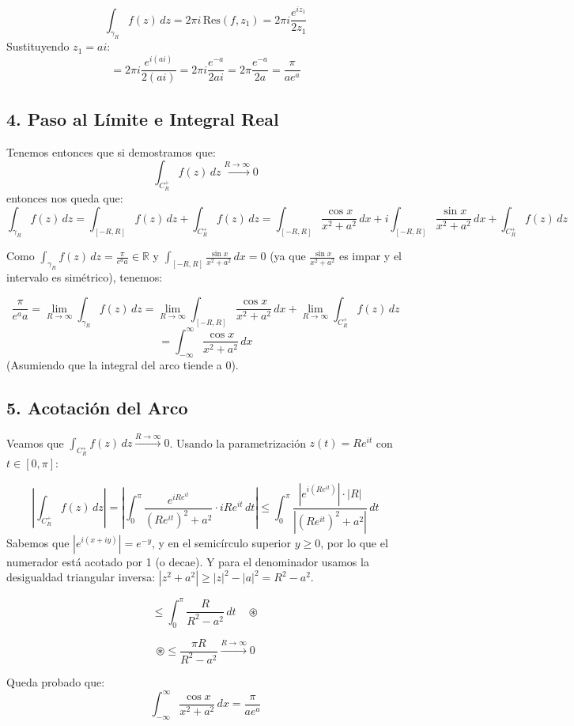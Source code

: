 {\[
\int_{\gamma_R} f(z) \, dz = 2\pi i \, \text{Res}(f, z_1) = 2\pi i \frac{e^{iz_1}}{2z_1}
\]
Sustituyendo $z_1 = ai$:
\[
= 2\pi i \frac{e^{i(ai)}}{2(ai)} = 2\pi i \frac{e^{-a}}{2ai} = 2\pi \frac{e^{-a}}{2a} = \frac{\pi}{a e^a}
\]

\subsection*{4. Paso al Límite e Integral Real}

Tenemos entonces que si demostramos que:
\[
\int_{C_R^+} f(z) \, dz \xrightarrow{R \to \infty} 0
\]
entonces nos queda que:
\[
\int_{\gamma_R} f(z) \, dz = \int_{[-R,R]} f(z) \, dz + \int_{C_R^+} f(z) \, dz = \int_{[-R,R]} \frac{\cos x}{x^2+a^2} \, dx + i \int_{[-R,R]} \frac{\sin x}{x^2+a^2} \, dx + \int_{C_R^+} f(z) \, dz
\]

Como $\int_{\gamma_R} f(z) \, dz = \frac{\pi}{e^a a} \in \mathbb{R}$ y $\int_{[-R,R]} \frac{\sin x}{x^2+a^2} \, dx = 0$ (ya que $\frac{\sin x}{x^2+a^2}$ es impar y el intervalo es simétrico), tenemos:

\[
\frac{\pi}{e^a a} = \lim_{R \to \infty} \int_{\gamma_R} f(z) \, dz = \lim_{R \to \infty} \int_{[-R,R]} \frac{\cos x}{x^2+a^2} \, dx + \lim_{R \to \infty} \int_{C_R^+} f(z) \, dz
\]
\[
= \int_{-\infty}^{\infty} \frac{\cos x}{x^2+a^2} \, dx
\]
(Asumiendo que la integral del arco tiende a 0).

\subsection*{5. Acotación del Arco }

Veamos que $\int_{C_R^+} f(z) \, dz \xrightarrow{R \to \infty} 0$.
Usando la parametrización $z(t) = R e^{it}$ con $t \in [0, \pi]$:

\[
\left| \int_{C_R^+} f(z) \, dz \right| = \left| \int_{0}^{\pi} \frac{e^{i R e^{it}}}{(R e^{it})^2 + a^2} \cdot i R e^{it} \, dt \right| \le \int_{0}^{\pi} \frac{|e^{i(R e^{it})}| \cdot |R|}{|(R e^{it})^2 + a^2|} \, dt
\]
Sabemos que $|e^{i(x+iy)}| = e^{-y}$, y en el semicírculo superior $y \ge 0$, por lo que el numerador está acotado por 1 (o decae). Y para el denominador usamos la desigualdad triangular inversa: $|z^2+a^2| \ge |z|^2 - |a|^2 = R^2 - a^2$.

\[
\le \int_{0}^{\pi} \frac{R}{R^2 - a^2} \, dt \quad \circledast
\]

\[
\circledast \le \frac{\pi R}{R^2 - a^2} \xrightarrow{R \to \infty} 0
\]

Queda probado que:
\[
\boxed{ \int_{-\infty}^{\infty} \frac{\cos x}{x^2+a^2} \, dx = \frac{\pi}{a e^a} }
\]}
